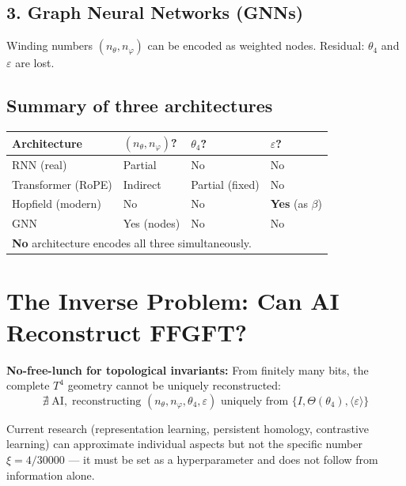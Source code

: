 \subsection*{3. Graph Neural Networks (GNNs)}

Winding numbers $(n_\theta,n_\varphi)$ can be encoded as weighted nodes.
Residual: $\theta_4$ and $\varepsilon$ are lost.

\subsection*{Summary of three architectures}

\begin{center}
\renewcommand{\arraystretch}{1.3}
{\small
\begin{tabular}{p{3.5cm}p{3cm}p{3cm}p{3cm}}
\toprule
\textbf{Architecture} & \textbf{$(n_\theta,n_\varphi)$?} & \textbf{$\theta_4$?} & \textbf{$\varepsilon$?} \\
\midrule
RNN (real) & Partial & No & No \\
Transformer (RoPE) & Indirect & Partial (fixed) & No \\
Hopfield (modern) & No & No & \textbf{Yes} (as $\beta$) \\
GNN & Yes (nodes) & No & No \\
\midrule
\multicolumn{4}{l}{\textbf{No} architecture encodes all three simultaneously.} \\
\bottomrule
\end{tabular}
}
\end{center}

\section{The Inverse Problem: Can AI Reconstruct FFGFT?}

\textbf{No-free-lunch for topological invariants:} From finitely many bits,
the complete $T^4$ geometry cannot be uniquely reconstructed:
\begin{equation}
  \nexists\;\text{AI},\;\text{reconstructing }
  (n_\theta,n_\varphi,\theta_4,\varepsilon)
  \text{ uniquely from }
  \{I,\Theta(\theta_4),\langle\varepsilon\rangle\}
  \tag{243.14}
\end{equation}

Current research (representation learning, persistent homology, contrastive
learning) can approximate individual aspects but not the specific number
$\xi = 4/30000$ --- it must be set as a hyperparameter and does not follow
from information alone.

